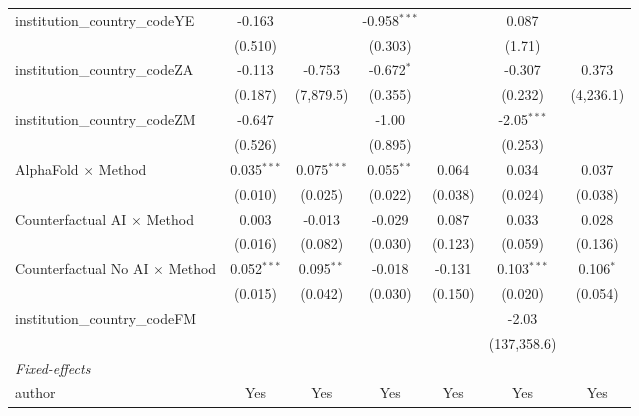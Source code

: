 \begin{tabular}{lcccccc}
   institution\_country\_codeYE          & -0.163         &               & -0.958$^{***}$ &               & 0.087          &   \\   
                                         & (0.510)        &               & (0.303)        &               & (1.71)         &   \\   
   institution\_country\_codeZA          & -0.113         & -0.753        & -0.672$^{*}$   &               & -0.307         & 0.373\\   
                                         & (0.187)        & (7,879.5)     & (0.355)        &               & (0.232)        & (4,236.1)\\   
   institution\_country\_codeZM          & -0.647         &               & -1.00          &               & -2.05$^{***}$  &   \\   
                                         & (0.526)        &               & (0.895)        &               & (0.253)        &   \\   
   AlphaFold $\times$ Method             & 0.035$^{***}$  & 0.075$^{***}$ & 0.055$^{**}$   & 0.064         & 0.034          & 0.037\\   
                                         & (0.010)        & (0.025)       & (0.022)        & (0.038)       & (0.024)        & (0.038)\\   
   Counterfactual AI $\times$ Method     & 0.003          & -0.013        & -0.029         & 0.087         & 0.033          & 0.028\\   
                                         & (0.016)        & (0.082)       & (0.030)        & (0.123)       & (0.059)        & (0.136)\\   
   Counterfactual No AI $\times$ Method  & 0.052$^{***}$  & 0.095$^{**}$  & -0.018         & -0.131        & 0.103$^{***}$  & 0.106$^{*}$\\   
                                         & (0.015)        & (0.042)       & (0.030)        & (0.150)       & (0.020)        & (0.054)\\   
   institution\_country\_codeFM          &                &               &                &               & -2.03          &   \\   
                                         &                &               &                &               & (137,358.6)    &   \\   
   \midrule
   \emph{Fixed-effects}\\
   author                                & Yes            & Yes           & Yes            & Yes           & Yes            & Yes\\  

\end{tabular}
